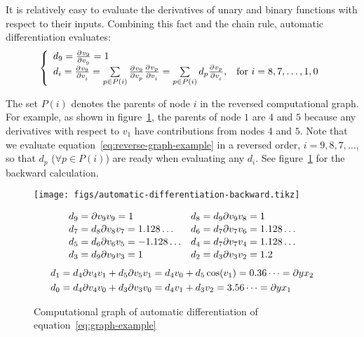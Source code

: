 It is relatively easy to evaluate the derivatives of unary and binary functions with respect to their inputs.
Combining this fact and the chain rule, automatic differentiation evaluates:
\begin{equation}\label{eq:reverse-graph-example}
    \left\{
        \begin{array}{ll}
            d_9 = \pdiff[v_9][v_9] = 1 & \\
            d_i = \pdiff[v_9][v_i]
                = \sum\limits_{p\in P(i)}\pdiff[v_9][v_p]\pdiff[v_p][v_i]
                = \sum\limits_{p\in P(i)}d_p\pdiff[v_p][v_i], & \text{for }i=8, 7, \ldots, 1, 0
        \end{array}
    \right.
\end{equation}

The set $P(i)$ denotes the parents of node $i$ in the reversed computational graph.
For example, as shown in figure~\ref{fig:automatic-differentiation-backward}, the parents of node $1$ are $4$ and $5$ because any derivatives with respect to $v_1$ have contributions from nodes $4$ and $5$.
Note that we evaluate equation~\ref{eq:reverse-graph-example} in a reversed order, $i=9, 8, 7, \ldots$, so that $d_p$ ($\forall p\in P(i)$) are ready when evaluating any $d_i$.
See figure~\ref{fig:automatic-differentiation-backward} for the backward calculation.
\begin{figure}[hbt!]
    \begin{minipage}{0.4\textwidth}
        \texttt{[image: figs/automatic-differentiation-backward.tikz]}
    \end{minipage}%
    \begin{minipage}{0.5\textwidth}
        \scriptsize
        \singlespacing
        \begin{equation*}
            \begin{aligned}
                d_9& = \pdiff{v_9}{v_9} = 1 & d_8& = d_9 \pdiff{v_9}{v_8} = 1 \\[-2pt]
                d_7& = d_8 \pdiff{v_8}{v_7} = 1.128\dots & d_6& = d_7 \pdiff{v_7}{v_6} = 1.128\dots \\[-2pt]
                d_5& = d_6 \pdiff{v_6}{v_5} = -1.128\dots & d_4& = d_7 \pdiff{v_7}{v_4} = 1.128\dots \\[-2pt]
                d_3& = d_9 \pdiff{v_9}{v_3} = 1 & d_2& = d_3 \pdiff{v_3}{v_2} = 1.2
            \end{aligned}
        \end{equation*}%
        \begin{equation*}
            \begin{aligned}
                d_1& = d_4 \pdiff{v_4}{v_1} + d_5 \pdiff{v_5}{v_1} = d_4v_0 + d_5\cos(v_1) = 0.36\dots = \pdiff{y}{x_2} \\
                d_0& = d_4 \pdiff{v_4}{v_0} + d_3 \pdiff{v_3}{v_0} = d_4v_1+d_3v_2 = 3.56\dots = \pdiff{y}{x_1}
            \end{aligned}
        \end{equation*}
    \end{minipage}
    \caption{Computational graph of automatic differentiation of equation~\ref{eq:graph-example}}%
    \label{fig:automatic-differentiation-backward}
\end{figure}
